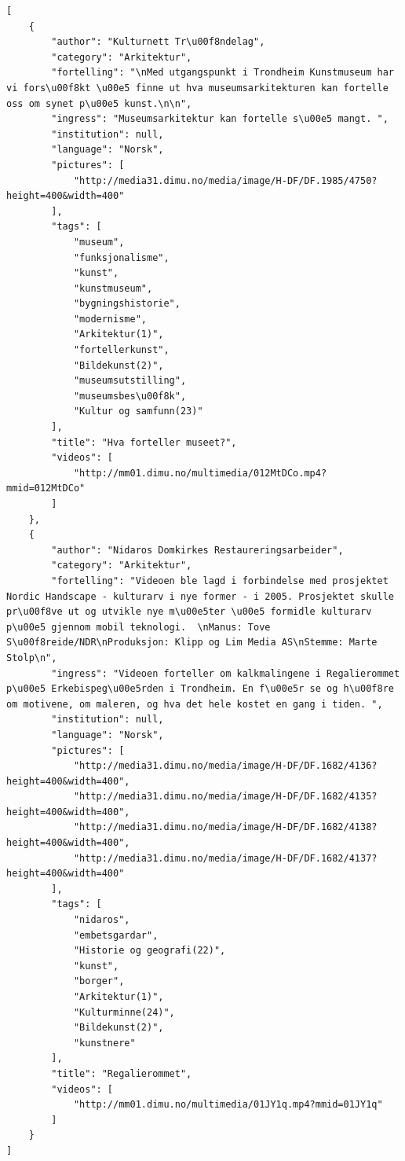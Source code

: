 \documentclass[11pt]{book}
\begin{document}
\begin{lstlisting}[frame=single]
[
    {
        "author": "Kulturnett Tr\u00f8ndelag",
        "category": "Arkitektur",
        "fortelling": "\nMed utgangspunkt i Trondheim Kunstmuseum har vi fors\u00f8kt \u00e5 finne ut hva museumsarkitekturen kan fortelle oss om synet p\u00e5 kunst.\n\n",
        "ingress": "Museumsarkitektur kan fortelle s\u00e5 mangt. ",
        "institution": null,
        "language": "Norsk",
        "pictures": [
            "http://media31.dimu.no/media/image/H-DF/DF.1985/4750?height=400&width=400"
        ],
        "tags": [
            "museum",
            "funksjonalisme",
            "kunst",
            "kunstmuseum",
            "bygningshistorie",
            "modernisme",
            "Arkitektur(1)",
            "fortellerkunst",
            "Bildekunst(2)",
            "museumsutstilling",
            "museumsbes\u00f8k",
            "Kultur og samfunn(23)"
        ],
        "title": "Hva forteller museet?",
        "videos": [
            "http://mm01.dimu.no/multimedia/012MtDCo.mp4?mmid=012MtDCo"
        ]
    },
    {
        "author": "Nidaros Domkirkes Restaureringsarbeider",
        "category": "Arkitektur",
        "fortelling": "Videoen ble lagd i forbindelse med prosjektet Nordic Handscape - kulturarv i nye former - i 2005. Prosjektet skulle pr\u00f8ve ut og utvikle nye m\u00e5ter \u00e5 formidle kulturarv p\u00e5 gjennom mobil teknologi.  \nManus: Tove S\u00f8reide/NDR\nProduksjon: Klipp og Lim Media AS\nStemme: Marte Stolp\n",
        "ingress": "Videoen forteller om kalkmalingene i Regalierommet p\u00e5 Erkebispeg\u00e5rden i Trondheim. En f\u00e5r se og h\u00f8re om motivene, om maleren, og hva det hele kostet en gang i tiden. ",
        "institution": null,
        "language": "Norsk",
        "pictures": [
            "http://media31.dimu.no/media/image/H-DF/DF.1682/4136?height=400&width=400",
            "http://media31.dimu.no/media/image/H-DF/DF.1682/4135?height=400&width=400",
            "http://media31.dimu.no/media/image/H-DF/DF.1682/4138?height=400&width=400",
            "http://media31.dimu.no/media/image/H-DF/DF.1682/4137?height=400&width=400"
        ],
        "tags": [
            "nidaros",
            "embetsgardar",
            "Historie og geografi(22)",
            "kunst",
            "borger",
            "Arkitektur(1)",
            "Kulturminne(24)",
            "Bildekunst(2)",
            "kunstnere"
        ],
        "title": "Regalierommet",
        "videos": [
            "http://mm01.dimu.no/multimedia/01JY1q.mp4?mmid=01JY1q"
        ]
    }
]
\end{lstlisting}
\end{document}
